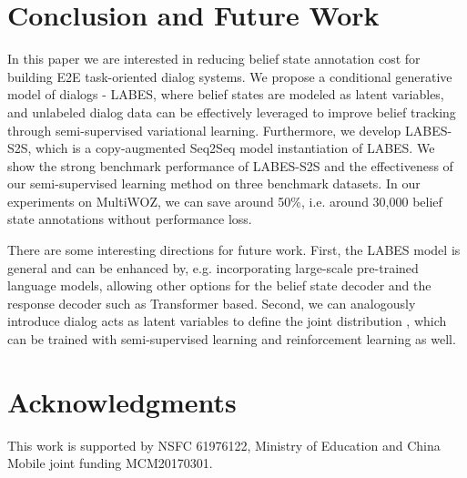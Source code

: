\documentclass[11pt,a4paper]{article}
\newcommand{\modelname}{LABES}
\begin{document}
	
	\section{Conclusion and Future Work}
	In this paper we are interested in reducing belief state annotation cost for building E2E task-oriented dialog systems. We propose a conditional generative model of dialogs - \modelname{}, where belief states are modeled as latent variables, and unlabeled dialog data can be effectively leveraged to improve belief tracking through semi-supervised variational learning. 
	Furthermore, we develop LABES-S2S, which is a copy-augmented Seq2Seq model instantiation of LABES.
	We show the strong benchmark performance of \modelname{}-S2S and the effectiveness of our semi-supervised learning method on three benchmark datasets. In our experiments on MultiWOZ, we can save around 50\%, i.e. around 30,000 belief state annotations without performance loss. 
	
	There are some interesting directions for future work.
	First, the \modelname{} model is general and can be enhanced by, e.g. incorporating large-scale pre-trained language models, allowing other options for the belief state decoder and the response decoder such as Transformer based.
Second, we can analogously introduce dialog acts  as latent variables to define the joint distribution , which can be trained with semi-supervised learning and reinforcement learning as well.
	
	\section*{Acknowledgments}
	This work is supported by NSFC 61976122, Ministry of Education and China Mobile joint funding MCM20170301.
	
	
	
	
\appendix
	
\end{document}
